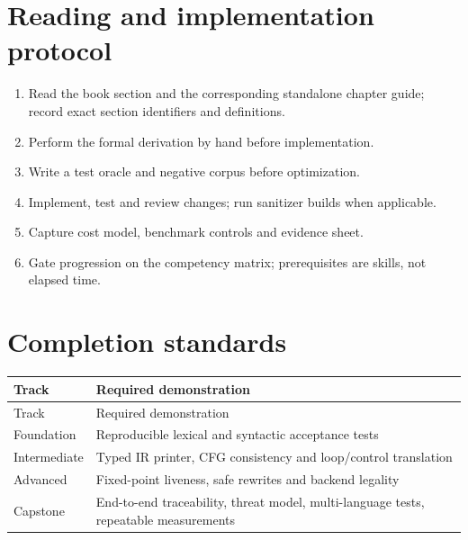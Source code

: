 \documentclass[10pt,letterpaper]{article}
\begin{document}
\section{Reading and implementation protocol}
\begin{enumerate}
\item Read the book section and the corresponding standalone chapter guide; record exact section identifiers and definitions.
\item Perform the formal derivation by hand before implementation.
\item Write a test oracle and negative corpus before optimization.
\item Implement, test and review changes; run sanitizer builds when applicable.
\item Capture cost model, benchmark controls and evidence sheet.
\item Gate progression on the competency matrix; prerequisites are skills, not elapsed time.
\end{enumerate}

\section{Completion standards}
\begin{longtable}{|>{\raggedright\arraybackslash}p{}|>{\raggedright\arraybackslash}p{}|}
\hline
Track & Required demonstration\\ \hline\endfirsthead
\hline
Track & Required demonstration\\ \hline\endhead
Foundation & Reproducible lexical and syntactic acceptance tests\\ \hline
Intermediate & Typed IR printer, CFG consistency and loop/control translation\\ \hline
Advanced & Fixed-point liveness, safe rewrites and backend legality\\ \hline
Capstone & End-to-end traceability, threat model, multi-language tests, repeatable measurements\\ \hline
\end{longtable}
\end{document}

